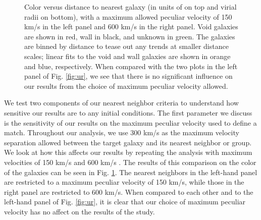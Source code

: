 \begin{figure}
    \caption[Sensitivity to peculiar velocity maximum]{Color versus distance to 
    nearest galaxy (in units of \hMpc on top and virial radii on bottom), with a 
    maximum allowed peculiar velocity of 150 km/s in the left panel and 600 km/s 
    in the right panel.  Void galaxies are shown in red, wall in black, and 
    unknown in green.  The galaxies are binned by distance to tease out any 
    trends at smaller distance scales; linear fits to the void and wall galaxies 
    are shown in orange and blue, respectively.  When compared with the two 
    plots in the left panel of Fig. \ref{fig:ur}, we see that there is no 
    significant influence on our results from the choice of maximum peculiar 
    velocity allowed.}
    \label{fig:ur_vpeculiar}
\end{figure}

We test two components of our nearest neighbor criteria to understand how 
sensitive our results are to any initial conditions.  The first parameter we 
discuss is the sensitivity of our results on the maximum peculiar velocity used 
to define a match.  Throughout our analysis, we use 300 km/s as the maximum 
velocity separation allowed between the target galaxy and its nearest neighbor 
or group.  We look at how this affects our results by repeating the analysis 
with maximum velocities of 150 km/s and 600 km/s \citep[the criteria used in][]
{Hwang10,Guo11}.  The results of this comparison on the color of the galaxies 
can be seen in Fig. \ref{fig:ur_vpeculiar}.  The nearest neighbors in the 
left-hand panel are restricted to a maximum peculiar velocity of 150 km/s, while 
those in the right panel are restricted to 600 km/s.  When compared to each 
other and to the left-hand panel of Fig. \ref{fig:ur}, it is clear that our 
choice of maximum peculiar velocity has no affect on the results of the study.

